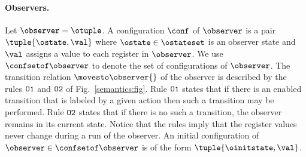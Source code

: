 
\paragraph{Observers.}

Let $\observer=\otuple$.
%
A configuration $\conf$ of $\observer$
is a pair $\tuple{\ostate,\val}$
where $\ostate\in\ostateset$ is an observer state and
$\val$ assigns a value to each register in $\observer$.
%
%
We use $\confsetof\observer$ to denote the set of configurations
of $\observer$.
%
The transition relation $\movesto\observer{}$
of the observer is described by the rules
${\tt O1}$ and ${\tt O2}$ of Fig.~\ref{semantics:fig}.
%
Rule ${\tt O1}$ states that
if there is an enabled  transition that is labeled by a given action
  then such a transition may be performed. 
%
Rule ${\tt O2}$ states that if there is no
such a transition, the observer remains in its current state.
%
Notice that the rules imply that the register
values never change during a run of the observer. 
%
An initial configuration of $\observer\in\confsetof\observer$
is of the form $\tuple{\oinitstate,\val}$.


